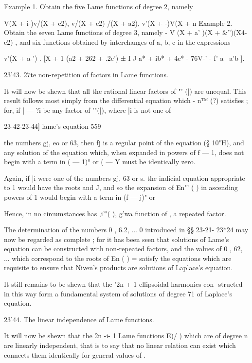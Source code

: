 {{{{{{{Example 1. Obtain the five Lame functions of degree 2, namely 

V(X + i-)v/(X + c2), v/(X + c2) /(X + a2), v'(X +  -)V(X + n 
Example 2. Obtain the seven Lame functions of degree 3, namely 
- V (X + a' )(X + \&'')(X4-c2) , 
and six functions obtained by interchanges of a, b, c in the expressions 

v'(X + a-') . [X + 1 (a2 + 262 + .2c') ± I J a* + ib* + 4c* - 76V-' - f' a  \  a'b  ]. 

23'43. 27te non-repetition of factors in Lame functions. 

It will now be shewn that all the rational linear factors of   "' (|) are 
unequal. This result follows most simply from the differential equation which 
- n™ (?) satisfies ; for, if | — ?i be any factor of   '"(|), where |i is not one of 



23-42-23-44] lame's equation 559 

the numbers gj, eo or 63, then fj is a regular point of the equation (§ 10"H), 
and any solution of the equation which, when expanded in powers of f —  1, 
does not begin with a term in ( —  1)° or (  —  Y must be identically zero. 

Again, if |i were one of the numbers gj, 63 or  s. the indicial equation 
appropriate to  1 would have the roots and J, and so the expansion of 
En"' ( ) in ascending powers of  1 would begin with a term in (f —  j)" or 

Hence, in no circumstances has  ,i'"( ), g'wa function of  , a repeated 
factor. 

The determination of the numbers 0 , 6.2, ... 0  introduced in §§ 23-21- 
23*24 may now be regarded as complete ; for it has been seen that solutions 
of Lame's equation can be constructed with non-repeated factors, and the 
values of 0 , 62, ... which correspond to the roots of En ( ) = satisfy the 
equations which are requisite to ensure that Niven's products are solutions of 
Laplace's equation. 

It still remains to be shewn that the '2n + 1 ellipsoidal harmonics con- 
structed in this way form a fundamental system of solutions of degree 71 of 
Laplace's equation. 

23'44. The linear independence of Lame functions. 

It will now be shewn that the 2n -i- 1 Lame functions E)/    ) which are 
of degree n are linearly independent, that is to say that no linear relation can 
exist which connects them identically for general values of  . 

}}}}}}}
